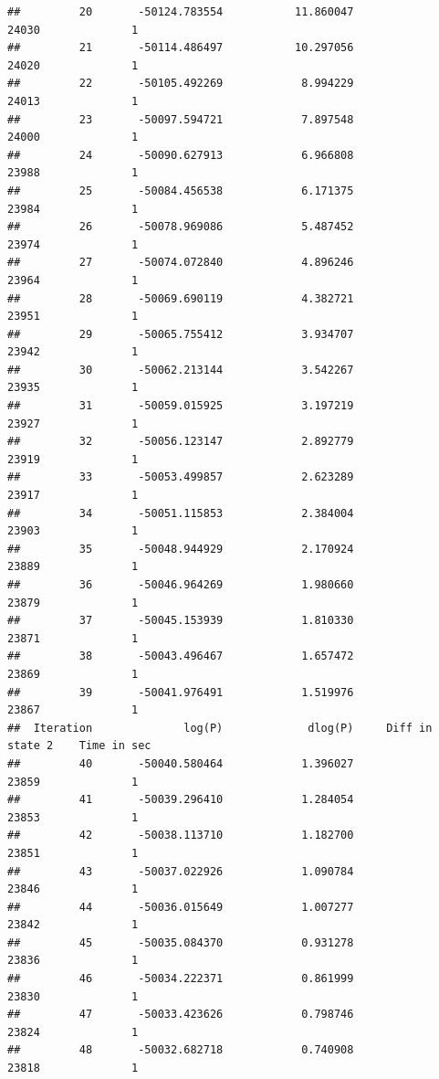 \documentclass[11pt]{article}\usepackage[]{graphicx}\usepackage[]{color}
\makeatletter
\newenvironment{kframe}{%
 \def\at@end@of@kframe{}%
 \ifinner\ifhmode%
  \def\at@end@of@kframe{\end{minipage}}%
  \begin{minipage}{\columnwidth}%
 \fi\fi%
 \def\FrameCommand##1{\hskip\@totalleftmargin \hskip-\fboxsep
 \colorbox{shadecolor}{##1}\hskip-\fboxsep
     \hskip-\linewidth \hskip-\@totalleftmargin \hskip\columnwidth}%
 \MakeFramed {\advance\hsize-\width
   \@totalleftmargin\z@ \linewidth\hsize
   \@setminipage}}%
 {\par\unskip\endMakeFramed%
 \at@end@of@kframe}
\newenvironment{knitrout}{}{} %
\makeatother
\begin{document}
\begin{scriptsize}
\begin{knitrout}
\begin{kframe}
\begin{verbatim}
##         20       -50124.783554           11.860047               24030              1
##         21       -50114.486497           10.297056               24020              1
##         22       -50105.492269            8.994229               24013              1
##         23       -50097.594721            7.897548               24000              1
##         24       -50090.627913            6.966808               23988              1
##         25       -50084.456538            6.171375               23984              1
##         26       -50078.969086            5.487452               23974              1
##         27       -50074.072840            4.896246               23964              1
##         28       -50069.690119            4.382721               23951              1
##         29       -50065.755412            3.934707               23942              1
##         30       -50062.213144            3.542267               23935              1
##         31       -50059.015925            3.197219               23927              1
##         32       -50056.123147            2.892779               23919              1
##         33       -50053.499857            2.623289               23917              1
##         34       -50051.115853            2.384004               23903              1
##         35       -50048.944929            2.170924               23889              1
##         36       -50046.964269            1.980660               23879              1
##         37       -50045.153939            1.810330               23871              1
##         38       -50043.496467            1.657472               23869              1
##         39       -50041.976491            1.519976               23867              1
##  Iteration              log(P)             dlog(P)     Diff in state 2    Time in sec
##         40       -50040.580464            1.396027               23859              1
##         41       -50039.296410            1.284054               23853              1
##         42       -50038.113710            1.182700               23851              1
##         43       -50037.022926            1.090784               23846              1
##         44       -50036.015649            1.007277               23842              1
##         45       -50035.084370            0.931278               23836              1
##         46       -50034.222371            0.861999               23830              1
##         47       -50033.423626            0.798746               23824              1
##         48       -50032.682718            0.740908               23818              1

\end{verbatim}
\end{kframe}
\end{knitrout}
\end{scriptsize}
\end{document}
